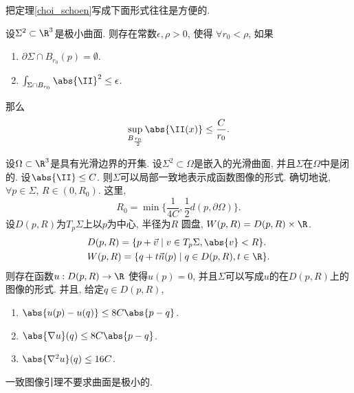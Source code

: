 把定理\eqref{choi_schoen}写成下面形式往往是方便的.
\begin{theorem*}\label{choi_schoen_cor}
    设$\Sigma^2 \subset \R^3$是极小曲面.  则存在常数$\epsilon, \rho>0$, 使得 $\forall r_0 < \rho$, 如果
    \begin{enumerate}
        \item $\partial \Sigma \cap B_{r_0}(p)=\emptyset$.
        \item $\int_{\Sigma \cap B_{r_0}} \abs{\II}^2\le \epsilon$.
    \end{enumerate}
    那么
    \begin{equation}
        \mathop{\sup}_{B_{\frac{r_0}{2}}}\abs{\II(x)} \le \frac{C}{r_0}.
    \end{equation}
\end{theorem*}

\begin{lemma}[一致图像引理] \label{uniform_graph}
    设$\Omega \subset \R^3$是具有光滑边界的开集. 设$\Sigma^2 \subset \Omega$是嵌入的光滑曲面, 并且$\Sigma$在$\Omega$中是闭的. 设$\abs{\II} \le C$. 则$\Sigma$可以局部一致地表示成函数图像的形式. 确切地说, $\forall p \in \Sigma$, $R\in (0,R_0)$. 这里, 
    \begin{equation}
        R_0=\min\{\frac{1}{4C}, \frac{1}{2}d(p,\partial \Omega)\}.
    \end{equation}
    设$D(p,R)$为$T_p\Sigma$上以$p$为中心, 半径为$R$ 圆盘, $W(p,R)=D(p,R)\times \R$. 
    \begin{align}
        &D(p,R)= \{p+\vec{v}\mid v \in T_p\Sigma, \abs{v} < R\}.  \\
        &W(p,R)= \{q+t\vec{n}(p)\mid q \in D(p,R), t \in \R\}.
    \end{align}
    则存在函数$u: D(p,R)\to \R$ 使得$u(p)=0$, 并且$\Sigma$可以写成$u$的在$D(p,R)$上的图像的形式. 并且, 给定$q \in D(p,R)$,
    \begin{enumerate}
        \item $\abs{u(p)-u(q)} \le 8C\abs{p-q}$.
        \item $\abs{\nabla u}(q) \le 8C\abs{p-q}$.
        \item $\abs{\nabla^2 u}(q) \le 16C$.
    \end{enumerate}
\end{lemma}
\begin{remark}
    一致图像引理不要求曲面是极小的.
\end{remark}
